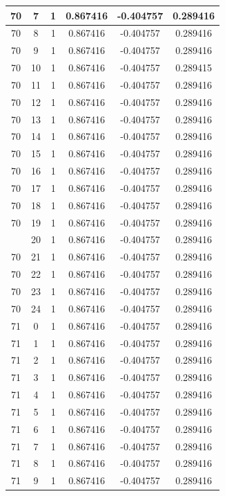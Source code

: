 \documentclass[12pt,a4paper]{article}
\numberwithin{equation}{section}
\numberwithin{figure}{section}
\numberwithin{table}{section}
\begin{document}
\begin{longtable}{|c|c|c|c|c|c|}
70 & 7 & 1 & 0.867416 & -0.404757 & 0.289416 \\ \hline
70 & 8 & 1 & 0.867416 & -0.404757 & 0.289416 \\ \hline
70 & 9 & 1 & 0.867416 & -0.404757 & 0.289416 \\ \hline
70 & 10 & 1 & 0.867416 & -0.404757 & 0.289415 \\ \hline
70 & 11 & 1 & 0.867416 & -0.404757 & 0.289416 \\ \hline
70 & 12 & 1 & 0.867416 & -0.404757 & 0.289416 \\ \hline
70 & 13 & 1 & 0.867416 & -0.404757 & 0.289416 \\ \hline
70 & 14 & 1 & 0.867416 & -0.404757 & 0.289416 \\ \hline
70 & 15 & 1 & 0.867416 & -0.404757 & 0.289416 \\ \hline
70 & 16 & 1 & 0.867416 & -0.404757 & 0.289416 \\ \hline
70 & 17 & 1 & 0.867416 & -0.404757 & 0.289416 \\ \hline
70 & 18 & 1 & 0.867416 & -0.404757 & 0.289416 \\ \hline
70 & 19 & 1 & 0.867416 & -0.404757 & 0.289416 \\ \hline
\pagebreak
70 & 20 & 1 & 0.867416 & -0.404757 & 0.289416 \\ \hline
70 & 21 & 1 & 0.867416 & -0.404757 & 0.289416 \\ \hline
70 & 22 & 1 & 0.867416 & -0.404757 & 0.289416 \\ \hline
70 & 23 & 1 & 0.867416 & -0.404757 & 0.289416 \\ \hline
70 & 24 & 1 & 0.867416 & -0.404757 & 0.289416 \\ \hline
71 & 0 & 1 & 0.867416 & -0.404757 & 0.289416 \\ \hline
71 & 1 & 1 & 0.867416 & -0.404757 & 0.289416 \\ \hline
71 & 2 & 1 & 0.867416 & -0.404757 & 0.289416 \\ \hline
71 & 3 & 1 & 0.867416 & -0.404757 & 0.289416 \\ \hline
71 & 4 & 1 & 0.867416 & -0.404757 & 0.289416 \\ \hline
71 & 5 & 1 & 0.867416 & -0.404757 & 0.289416 \\ \hline
71 & 6 & 1 & 0.867416 & -0.404757 & 0.289416 \\ \hline
71 & 7 & 1 & 0.867416 & -0.404757 & 0.289416 \\ \hline
71 & 8 & 1 & 0.867416 & -0.404757 & 0.289416 \\ \hline
71 & 9 & 1 & 0.867416 & -0.404757 & 0.289416 \\ \hline

\end{longtable}
\end{document}
